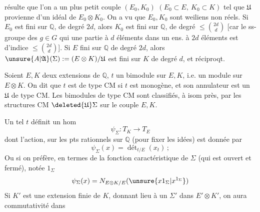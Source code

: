 résulte que l'on a un plus petit couple $(E_0,K_0)$ $(E_0\subset E,\ K_0\subset K)$
tel que $\mathfrak U$ provienne d'un idéal de $E_0\otimes K_0$.
On a vu que $E_0,K_0$ sont weiliens non réels. Si $E_0$ est fini sur $\mathbb Q$,
de degré $2d$, alors $K_0$ est fini sur $\mathbb Q$, de degré $\leq\binom{2d}{d}$
[car le ss-groupe des $g\in G$ qui  une partie à $d$ éléments
dans un ens. à $2d$ éléments est d'indice $\leq\binom{2d}{d}$].
 Si $E$ fini sur $\mathbb Q$ de degré $2d$, alors
$\unsure{A|\mathfrak A}(\Sigma):=(E\otimes K)/\mathfrak U$ est fini sur $K$ de degré $d$,
et réciproqt.

Soient $E,K$ deux extensions de $\mathbb Q$, $t$ un bimodule sur $E,K$, i.e. un module
sur $E\otimes K$. On dit que $t$ est de type CM si $t$ est monogène, et son annulateur
est un $\mathfrak U$ de type CM. Les bimodules de type CM  sont
classifiés, à isom près, par les structures CM $\deleted{\mathfrak U}\Sigma$ sur le couple $E,K$.

Un tel $t$ définit 
un hom
\[
\psi_\Sigma:T_K\longrightarrow T_E
\]
dont l'action, sur les pts rationnels sur $\mathbb Q$ (pour fixer les idées) est donnée par
\[
\psi_\Sigma(x)=\operatorname{dét}_{t/E}(x_t)\,;
\]
Ou si on préfère, en termes de la fonction caractéristique de $\Sigma$
(qui est ouvert et fermé), notée  $1_\Sigma$
\[
\psi_\Sigma(x)=N_{E\otimes K/E}(\unsure{x1_\Sigma|x^{1_\Sigma}})
\]
Si $K'$ est une extension finie de $K$, 
donnant lieu à un $\Sigma'$ dans $E'\otimes K'$, on aura commutativité dans
